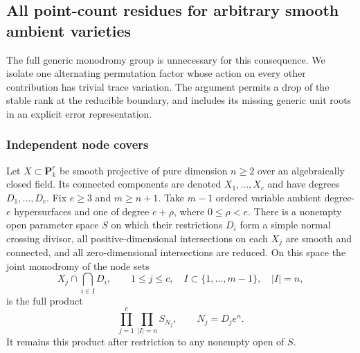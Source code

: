 \subsection{All point-count residues for arbitrary smooth ambient varieties}
\label{subsec:general-X-residues}

The full generic monodromy group is unnecessary for this
consequence.  We isolate one alternating permutation factor
whose action on every other contribution has trivial trace
variation.  The argument permits a drop of the stable rank
at the reducible boundary, and includes its missing generic
unit roots in an explicit error representation.

\subsubsection{Independent node covers}

\begin{lemma}\label{lem:all-X-independent-nodes}
Let $X\subset\mathbf P^r_k$ be smooth projective of pure
dimension $n\geq2$ over an algebraically closed field.
Its connected components are denoted $X_1,\ldots,X_c$ and
have degrees $D_1,\ldots,D_c$.  Fix $e\geq3$ and $m\geq n+1$.
Take $m-1$ ordered variable ambient degree-$e$ hypersurfaces
and one of degree $e+\rho$, where $0\leq\rho<e$.
There is a nonempty open parameter space $S$ on which their
restrictions $D_i$ form a simple normal crossing divisor,
all positive-dimensional intersections on each $X_j$ are
smooth and connected, and all zero-dimensional intersections
are reduced.  On this space the joint monodromy of the
node sets
\[
 X_j\cap\bigcap_{i\in I}D_i,\qquad
 1\leq j\leq c,\quad
 I\subset\{1,\ldots,m-1\},\quad |I|=n,
\]
is the full product
\[
 \prod_{j=1}^c\prod_{|I|=n} S_{N_j},
 \qquad N_j=D_j e^n.
 \tag{6}
\]
It remains this product after restriction to any nonempty
open of $S$.
\end{lemma}

